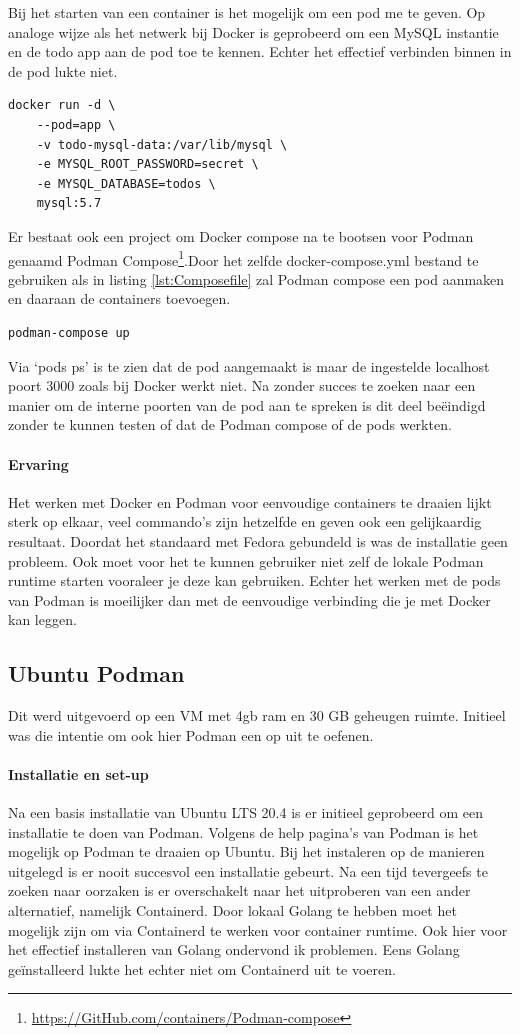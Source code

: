 Bij het starten van een container is het mogelijk om een pod me te geven. Op analoge wijze als het netwerk bij Docker is geprobeerd om een MySQL instantie en de todo app aan de pod toe te kennen. Echter het effectief verbinden binnen in de pod lukte niet.
\begin{lstlisting}
docker run -d \
    --pod=app \
    -v todo-mysql-data:/var/lib/mysql \
    -e MYSQL_ROOT_PASSWORD=secret \
    -e MYSQL_DATABASE=todos \
    mysql:5.7
\end{lstlisting}

Er bestaat ook een project om Docker compose na te bootsen voor Podman genaamd Podman Compose\footnote{\url{https://GitHub.com/containers/Podman-compose}}.Door het zelfde docker-compose.yml bestand te gebruiken als in listing \ref{lst:Composefile} zal Podman compose een pod aanmaken en daaraan de containers toevoegen. 

\begin{verbatim}
podman-compose up
\end{verbatim}
Via `pods ps' is te zien dat de pod aangemaakt is maar de ingestelde localhost poort 3000 zoals bij Docker werkt niet. Na zonder succes te zoeken naar een manier om de interne poorten van de pod aan te spreken is dit deel beëindigd zonder te kunnen testen of dat de Podman compose of de pods werkten.

\paragraph{Ervaring}
Het werken met Docker en Podman voor eenvoudige containers te draaien lijkt sterk op elkaar, veel commando’s zijn hetzelfde en geven ook een gelijkaardig resultaat. Doordat het standaard met Fedora gebundeld is was de installatie geen probleem. Ook moet voor het te kunnen gebruiker niet zelf de lokale Podman runtime starten vooraleer je deze kan gebruiken. Echter het werken met de pods van Podman is moeilijker dan met de eenvoudige verbinding die je met Docker kan leggen.

\subsection{Ubuntu Podman}
Dit werd uitgevoerd op een VM met 4gb ram en 30 GB geheugen ruimte. Initieel was die intentie om ook hier Podman een op uit te oefenen.

\paragraph{Installatie en set-up}
Na een basis installatie van Ubuntu LTS 20.4 is er initieel geprobeerd om een installatie te doen van Podman. Volgens de help pagina’s van Podman is het mogelijk op Podman te draaien op Ubuntu. Bij het instaleren op de manieren uitgelegd is er nooit succesvol een installatie gebeurt. Na een tijd tevergeefs te zoeken naar oorzaken is er overschakelt naar het uitproberen van een ander alternatief, namelijk Containerd.
Door lokaal Golang te hebben moet het mogelijk zijn om via Containerd te werken voor container runtime. Ook hier voor het effectief installeren van Golang ondervond ik problemen.  Eens Golang geïnstalleerd lukte het echter niet om Containerd uit te voeren.

